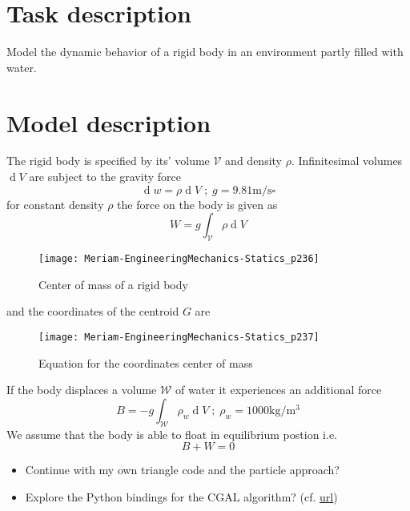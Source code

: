
\tableofcontents
\section{Task description}
Model the dynamic behavior of a rigid body in an environment partly filled with water.

\section{Model description}
The rigid body is specified by its' volume $\mathcal{V}$ and density $\rho$.  
Infinitesimal volumes $\operatorname{d}V$ are subject to the gravity force 
$$\operatorname{d} w  = \rho \operatorname{d} V \;;\; g = \num{9.81} \si{\meter\per\second\square}$$
for constant density $\rho$ the force on the body is given as
$$W = g \int_{\mathcal{V}} \rho \operatorname{d} V$$
\begin{figure}[H]
	\centering
	\texttt{[image: Meriam-EngineeringMechanics-Statics\_p236]}
	\caption{
		Center of mass of a rigid body
	}
	\label{fig:f5/4}
\end{figure}
and the coordinates of the centroid $G$ are
\begin{figure}[H]
	\centering
	\texttt{[image: Meriam-EngineeringMechanics-Statics\_p237]}
	\caption{Equation for the coordinates center of mass}
	\label{fig:e5/4}
\end{figure}
If the body displaces a volume $\mathcal{W}$ of water it experiences an additional force
$$B = -g \int_{\mathcal{W}} \rho_w  \operatorname{d} V \;;\; \rho_w = \num{1000}\si{\kilo\gram\per\meter\cubed}$$
We assume that the body is able to float in equilibrium postion i.e.
$$B + W = 0$$
\begin{itemize}
	\item Continue with my own triangle code and the particle approach? \item Explore the Python bindings for the CGAL algorithm? (cf.  \href{https://code.google.com/p/cgal-bindings/}{url})
	\end{itemize}

